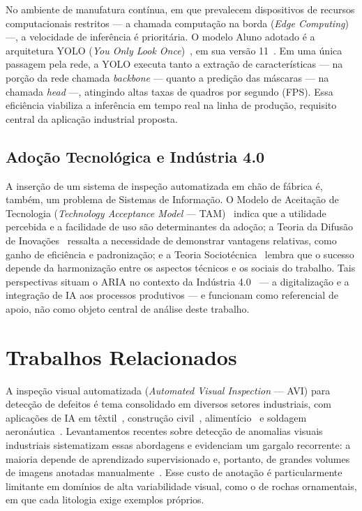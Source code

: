 \documentclass[12pt]{article}
\begin{document}
No ambiente de manufatura contínua, em que prevalecem dispositivos de recursos computacionais restritos --- a chamada computação na borda (\textit{Edge Computing}) ---, a velocidade de inferência é prioritária. O modelo Aluno adotado é a arquitetura YOLO (\textit{You Only Look Once})~\cite{yolo_redmon2016}, em sua versão 11~\cite{yolo11_khanam2024}. Em uma única passagem pela rede, a YOLO executa tanto a extração de características --- na porção da rede chamada \textit{backbone} --- quanto a predição das máscaras --- na chamada \textit{head} ---, atingindo altas taxas de quadros por segundo (FPS). Essa eficiência viabiliza a inferência em tempo real na linha de produção, requisito central da aplicação industrial proposta.

\subsection{Adoção Tecnológica e Indústria 4.0}

A inserção de um sistema de inspeção automatizada em chão de fábrica é, também, um problema de Sistemas de Informação. O Modelo de Aceitação de Tecnologia (\textit{Technology Acceptance Model} --- TAM)~\cite{tam_davis1989} indica que a utilidade percebida e a facilidade de uso são determinantes da adoção; a Teoria da Difusão de Inovações~\cite{diffusion_rogers2003} ressalta a necessidade de demonstrar vantagens relativas, como ganho de eficiência e padronização; e a Teoria Sociotécnica~\cite{sociotech_trist1951} lembra que o sucesso depende da harmonização entre os aspectos técnicos e os sociais do trabalho. Tais perspectivas situam o ARIA no contexto da Indústria 4.0~\cite{industry40_lee2014} --- a digitalização e a integração de IA aos processos produtivos --- e funcionam como referencial de apoio, não como objeto central de análise deste trabalho.

\section{Trabalhos Relacionados}
\label{sec:relacionados}

A inspeção visual automatizada (\textit{Automated Visual Inspection} --- AVI) para detecção de defeitos é tema consolidado em diversos setores industriais, com aplicações de IA em têxtil~\cite{avi_textile_sikka2024}, construção civil~\cite{avi_concrete_waqar2024}, alimentício~\cite{avi_food_chen2021} e soldagem aeronáutica~\cite{avi_welding_tsuzuki2022}. Levantamentos recentes sobre detecção de anomalias visuais industriais sistematizam essas abordagens e evidenciam um gargalo recorrente: a maioria depende de aprendizado supervisionado e, portanto, de grandes volumes de imagens anotadas manualmente~\cite{avi_anomaly_li2025}. Esse custo de anotação é particularmente limitante em domínios de alta variabilidade visual, como o de rochas ornamentais, em que cada litologia exige exemplos próprios.
\end{document}
